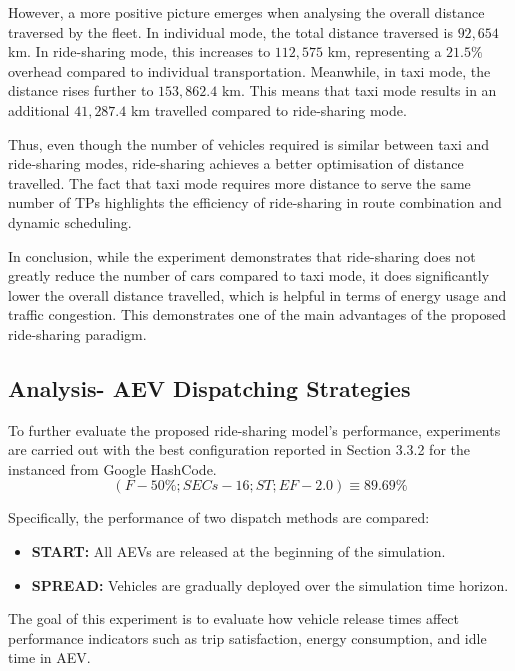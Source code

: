 However, a more positive picture emerges when analysing the overall distance traversed by the fleet. In individual mode, the total distance traversed is $92,654$ km. In ride-sharing mode, this increases to $112,575$ km, representing a $21.5\%$ overhead compared to individual transportation. Meanwhile, in taxi mode, the distance rises further to $153,862.4$ km. This means that taxi mode results in an additional $41,287.4$ km travelled compared to ride-sharing mode.

Thus, even though the number of vehicles required is similar between taxi and ride-sharing modes, ride-sharing achieves a better optimisation of distance travelled. The fact that taxi mode requires more distance to serve the same number of TPs highlights the efficiency of ride-sharing in route combination and dynamic scheduling. 

In conclusion, while the experiment demonstrates that ride-sharing does not greatly reduce the number of cars compared to taxi mode, it does significantly lower the overall distance travelled, which is helpful in terms of energy usage and traffic congestion.  This demonstrates one of the main advantages of the proposed ride-sharing paradigm.


\subsection{Analysis- AEV Dispatching Strategies}
\label{sec:ev_dispatching_strategies}

To further evaluate the proposed ride-sharing model's performance, experiments are carried out with the best configuration reported in Section 3.3.2 for the instanced from Google HashCode.
\[
     (F - 50\%; SECs - 16; ST; EF - 2.0) \equiv  89.69\%
\]

Specifically, the performance of two dispatch methods are compared:

\begin{itemize}
    \item \textbf{START:} All AEVs are released at the beginning of the simulation.
    \item \textbf{SPREAD:} Vehicles are gradually deployed over the simulation time horizon.
\end{itemize}

The goal of this experiment is to evaluate how vehicle release times affect performance indicators such as trip satisfaction, energy consumption, and idle time in AEV.

